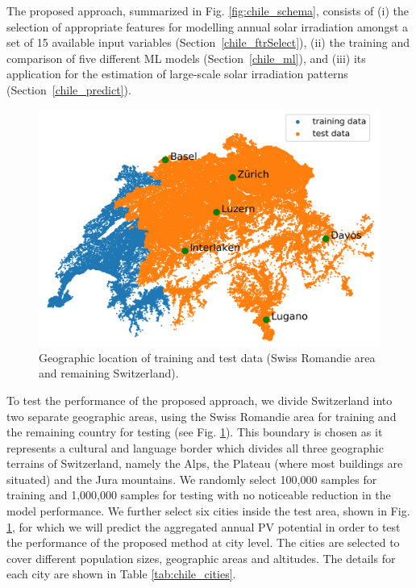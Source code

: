 The proposed approach, summarized in Fig. \ref{fig:chile_schema}, consists of (i) the selection of appropriate features for modelling annual solar irradiation amongst a set of 15 available input variables (Section~\ref{chile_ftrSelect}), (ii) the training and  comparison of five different ML models (Section~\ref{chile_ml}), and (iii) its application for the estimation of large-scale solar irradiation patterns (Section~\ref{chile_predict}). 

\begin{figure}[tb]
\centering\includegraphics[width=0.6\linewidth]{images/Figs/train_test_w_cities.png}
\caption{Geographic location of training and test data (Swiss Romandie area and remaining Switzerland).}
\label{fig:chile_case_study}
\end{figure}

To test the performance of the proposed approach, we divide Switzerland into two separate geographic areas, using the Swiss Romandie area for training and the remaining country for testing (see Fig. \ref{fig:chile_case_study}). This boundary is chosen as it represents a cultural and language border which divides all three geographic terrains of Switzerland, namely the Alps, the Plateau (where most buildings are situated) and the Jura mountains. 
We randomly select 100,000 samples for training and 1,000,000 samples for testing with no noticeable reduction in the model performance. 
We further select six cities inside the test area, shown in Fig. \ref{fig:chile_case_study}, for which we will predict the aggregated annual PV potential in order to test the performance of the proposed method at city level. The cities are selected to cover different population sizes, geographic areas and altitudes. The details for each city are shown in Table \ref{tab:chile_cities}. 

